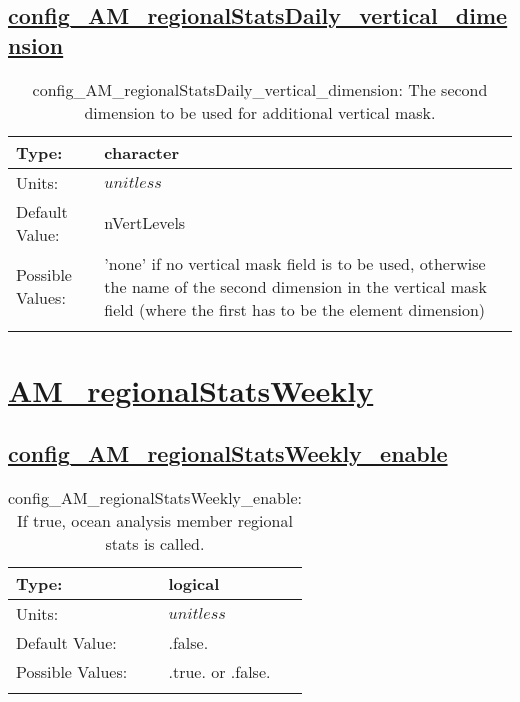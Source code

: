 \subsection[config\_AM\_regionalStatsDaily\_vertical\_dimension]{\hyperref[sec:nm_tab_AM_regionalStatsDaily]{config\_AM\_regionalStatsDaily\_vertical\_dimension}}
\label{subsec:nm_sec_config_AM_regionalStatsDaily_vertical_dimension}
\begin{center}
\begin{longtable}{| p{2.0in} || p{4.0in} |}
    \hline
    Type: & character \\
    \hline
    Units: & $unitless$ \\
    \hline
    Default Value: & nVertLevels \\
    \hline
    Possible Values: & 'none' if no vertical mask field is to be used, otherwise the name of the second dimension in the vertical mask field (where the first has to be the element dimension) \\
    \hline
    \caption{config\_AM\_regionalStatsDaily\_vertical\_dimension: The second dimension to be used for additional vertical mask.}
\end{longtable}
\end{center}
\section[AM\_regionalStatsWeekly]{\hyperref[sec:nm_tab_AM_regionalStatsWeekly]{AM\_regionalStatsWeekly}}
\label{sec:nm_sec_AM_regionalStatsWeekly}
\subsection[config\_AM\_regionalStatsWeekly\_enable]{\hyperref[sec:nm_tab_AM_regionalStatsWeekly]{config\_AM\_regionalStatsWeekly\_enable}}
\label{subsec:nm_sec_config_AM_regionalStatsWeekly_enable}
\begin{center}
\begin{longtable}{| p{2.0in} || p{4.0in} |}
    \hline
    Type: & logical \\
    \hline
    Units: & $unitless$ \\
    \hline
    Default Value: & .false. \\
    \hline
    Possible Values: & .true. or .false. \\
    \hline
    \caption{config\_AM\_regionalStatsWeekly\_enable: If true, ocean analysis member regional stats is called.}
\end{longtable}
\end{center}
